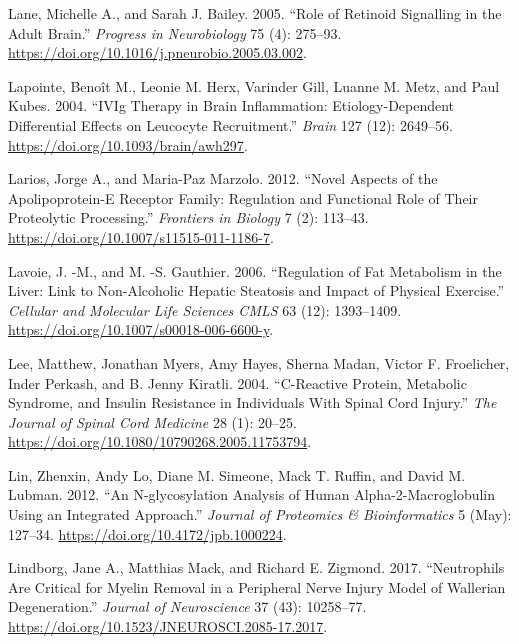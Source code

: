 \documentclass[9pt,lineno]{elife}
\newlength{\cslhangindent}
\newlength{\cslentryspacingunit} %
\newenvironment{CSLReferences}[2] %
 {%
  \setlength{\parindent}{0pt}
  \ifodd #1
  \let\oldpar\par
  \def\par{\hangindent=\cslhangindent\oldpar}
  \fi
  \setlength{\parskip}{#2\cslentryspacingunit}
 }%
 {}
\begin{document}
\begin{CSLReferences}{1}{0}
\leavevmode{}%
Lane, Michelle A., and Sarah J. Bailey. 2005. {``Role of Retinoid Signalling in the Adult Brain.''} \emph{Progress in Neurobiology} 75 (4): 275--93. \url{https://doi.org/10.1016/j.pneurobio.2005.03.002}.

\leavevmode{}%
Lapointe, Benoît M., Leonie M. Herx, Varinder Gill, Luanne M. Metz, and Paul Kubes. 2004. {``{IVIg} Therapy in Brain Inflammation: Etiology-Dependent Differential Effects on Leucocyte Recruitment.''} \emph{Brain} 127 (12): 2649--56. \url{https://doi.org/10.1093/brain/awh297}.

\leavevmode{}%
Larios, Jorge A., and Maria-Paz Marzolo. 2012. {``Novel Aspects of the Apolipoprotein-{E} Receptor Family: Regulation and Functional Role of Their Proteolytic Processing.''} \emph{Frontiers in Biology} 7 (2): 113--43. \url{https://doi.org/10.1007/s11515-011-1186-7}.

\leavevmode{}%
Lavoie, J. -M., and M. -S. Gauthier. 2006. {``Regulation of Fat Metabolism in the Liver: Link to Non-Alcoholic Hepatic Steatosis and Impact of Physical Exercise.''} \emph{Cellular and Molecular Life Sciences CMLS} 63 (12): 1393--1409. \url{https://doi.org/10.1007/s00018-006-6600-y}.

\leavevmode{}%
Lee, Matthew, Jonathan Myers, Amy Hayes, Sherna Madan, Victor F. Froelicher, Inder Perkash, and B. Jenny Kiratli. 2004. {``C-{Reactive Protein}, {Metabolic Syndrome}, and {Insulin Resistance} in {Individuals With Spinal Cord Injury}.''} \emph{The Journal of Spinal Cord Medicine} 28 (1): 20--25. \url{https://doi.org/10.1080/10790268.2005.11753794}.

\leavevmode{}%
Lin, Zhenxin, Andy Lo, Diane M. Simeone, Mack T. Ruffin, and David M. Lubman. 2012. {``An {N-glycosylation Analysis} of {Human Alpha-2-Macroglobulin Using} an {Integrated Approach}.''} \emph{Journal of Proteomics \& Bioinformatics} 5 (May): 127--34. \url{https://doi.org/10.4172/jpb.1000224}.

\leavevmode{}%
Lindborg, Jane A., Matthias Mack, and Richard E. Zigmond. 2017. {``Neutrophils {Are Critical} for {Myelin Removal} in a {Peripheral Nerve Injury Model} of {Wallerian Degeneration}.''} \emph{Journal of Neuroscience} 37 (43): 10258--77. \url{https://doi.org/10.1523/JNEUROSCI.2085-17.2017}.


\end{CSLReferences}
\end{document}
